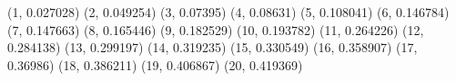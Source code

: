 (1, 0.027028) (2, 0.049254) (3, 0.07395) (4, 0.08631) (5, 0.108041) (6, 0.146784) (7, 0.147663) (8, 0.165446) (9, 0.182529) (10, 0.193782) (11, 0.264226) (12, 0.284138) (13, 0.299197) (14, 0.319235) (15, 0.330549) (16, 0.358907) (17, 0.36986) (18, 0.386211) (19, 0.406867) (20, 0.419369) 